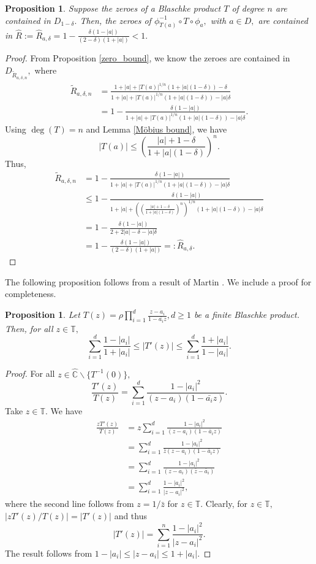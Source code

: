 \documentclass[12pt,reqno]{amsart}
\numberwithin{theorem}{section}
\newtheorem{proposition}[theorem]{Proposition}%
\begin{document}
\begin{proposition}\label{zero_bound_rfp}
     Suppose the zeroes of a Blaschke product $T$ of degree $n$ are contained in $D_{1-\delta}.$ Then, the zeroes of $\phi_{T(a)}^{-1}\circ T\circ\phi_{a},$ with $a\in D,$  are contained in $\hat{R}:=\hat{R}_{a,\delta}=1-\frac{\delta(1-|a|)}{(2-\delta)(1+|a|)}<1.$
\end{proposition}
\begin{proof}
    From Proposition \ref{zero_bound}, we know the zeroes are contained in $D_{\tilde{R}_{a,\delta,n}},$ where \begin{align*}\tilde{R}_{a,\delta,n}&=\frac{1+|a|+|T(a)|^{1/n}(1+|a|(1-\delta))-\delta}{1+|a|+|T(a)|^{1/n}(1+|a|(1-\delta))-|a|\delta}\\&=1-\frac{\delta(1-|a|)}{1+|a|+|T(a)|^{1/n}(1+|a|(1-\delta))-|a|\delta}.\end{align*}
 Using  $\deg(T)=n$ and Lemma \ref{Möbius bound}, we have $$|T(a)|\le\left(\frac{|a|+1-\delta}{1+|a|(1-\delta)}\right)^n.$$ Thus, \begin{align*}
    \tilde{R}_{a,\delta,n}&=1-\frac{\delta(1-|a|)}{1+|a|+|T(a)|^{1/n}(1+|a|(1-\delta))-|a|\delta}\\&\le1-\frac{\delta(1-|a|)}{1+|a|+\left(\left(\frac{|a|+1-\delta}{1+|a|(1-\delta)}\right)^n\right)^{1/n}(1+|a|(1-\delta))-|a|\delta}\\&=1-\frac{\delta(1-|a|)}{2+2|a|-\delta-|a|\delta}\\&=1-\frac{\delta(1-|a|)}{(2-\delta)(1+|a|)}=:\hat{R}_{a,\delta}.
\end{align*}
\end{proof}

The following proposition follows from a result of Martin \cite[Proposition 1]{martin}. We include a proof for completeness.
\begin{proposition}\label{derivative_bounds}
    Let $T(z)=\rho\prod_{i=1}^{d}\frac{z-a_{i}}{1-\bar{a_i}z}, d\ge1$ be a finite Blaschke product. Then, for all $z\in\mathbb{T},$ $$\sum_{i=1}^{d}\frac{1-|a_i|}{1+|a_i|}\le|T'(z)|\le\sum_{i=1}^{d}\frac{1+|a_i|}{1-|a_i|}.$$
\end{proposition}
\begin{proof}
    For all $z\in\hat{\mathbb{C}}\backslash\{T^{-1}(0)\},$ $$\frac{T'(z)}{T(z)}=\sum_{i=1}^{d}\frac{1-|a_i|^2}{(z-a_i)(1-\bar{a_i}z)}.$$ Take $z\in\mathbb{T}.$ We have \begin{align*}
        \frac{zT'(z)}{T(z)}&=z\sum_{i=1}^{d}\frac{1-|a_i|^2}{(z-a_i)(1-\bar{a}_iz)}\\&=\sum_{i=1}^{d}\frac{1-|a_i|^2}{\bar{z}(z-a_i)(1-\bar{a}_iz)}\\&=\sum_{i=1}^{d}\frac{1-|a_i|^2}{(z-a_i)(\bar{z}-\bar{a}_i)}\\&=\sum_{i=1}^{d}\frac{1-|a_i|^2}{|z-a_i|^2},
    \end{align*} where the second line follows from $z=1/\bar{z}$ for $z\in\mathbb{T}.$ Clearly, for $z\in\mathbb{T},$ $|zT'(z)/T(z)|=|T'(z)|$ and thus $$|T'(z)|=\sum_{i=1}^{n}\frac{1-|a_i|^2}{|z-a_i|^2}.$$ The result follows from $1-|a_i|\le|z-a_i|\le1+|a_i|$.
\end{proof}
\end{document}
